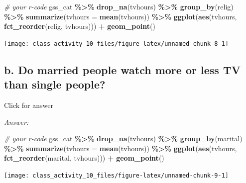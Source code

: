 \documentclass[
]{book}
\newenvironment{Shaded}{\begin{snugshade}}{\end{snugshade}}
\newcommand{\AttributeTok}[1]{\textcolor[rgb]{0.13,0.29,0.53}{#1}}
\newcommand{\CommentTok}[1]{\textcolor[rgb]{0.56,0.35,0.01}{\textit{#1}}}
\newcommand{\FunctionTok}[1]{\textcolor[rgb]{0.13,0.29,0.53}{\textbf{#1}}}
\newcommand{\NormalTok}[1]{#1}
\newcommand{\SpecialCharTok}[1]{\textcolor[rgb]{0.81,0.36,0.00}{\textbf{#1}}}
\begin{document}
\begin{Shaded}
\begin{Highlighting}[]
\CommentTok{\# your r{-}code}
\NormalTok{gss\_cat }\SpecialCharTok{\%\textgreater{}\%}
  \FunctionTok{drop\_na}\NormalTok{(tvhours) }\SpecialCharTok{\%\textgreater{}\%}
  \FunctionTok{group\_by}\NormalTok{(relig) }\SpecialCharTok{\%\textgreater{}\%}
  \FunctionTok{summarize}\NormalTok{(}\AttributeTok{tvhours =} \FunctionTok{mean}\NormalTok{(tvhours)) }\SpecialCharTok{\%\textgreater{}\%}
  \FunctionTok{ggplot}\NormalTok{(}\FunctionTok{aes}\NormalTok{(tvhours, }\FunctionTok{fct\_reorder}\NormalTok{(relig, tvhours))) }\SpecialCharTok{+}
    \FunctionTok{geom\_point}\NormalTok{()}
\end{Highlighting}
\end{Shaded}

\texttt{[image: class\_activity\_10\_files/figure-latex/unnamed-chunk-8-1]}

\hypertarget{b.-do-married-people-watch-more-or-less-tv-than-single-people}{%
\subsection{b. Do married people watch more or less TV than single people?}\label{b.-do-married-people-watch-more-or-less-tv-than-single-people}}

Click for answer

\emph{Answer:}

\begin{Shaded}
\begin{Highlighting}[]
\CommentTok{\# your r{-}code}
\NormalTok{gss\_cat }\SpecialCharTok{\%\textgreater{}\%}
  \FunctionTok{drop\_na}\NormalTok{(tvhours) }\SpecialCharTok{\%\textgreater{}\%}
  \FunctionTok{group\_by}\NormalTok{(marital) }\SpecialCharTok{\%\textgreater{}\%}
  \FunctionTok{summarize}\NormalTok{(}\AttributeTok{tvhours =} \FunctionTok{mean}\NormalTok{(tvhours)) }\SpecialCharTok{\%\textgreater{}\%}
  \FunctionTok{ggplot}\NormalTok{(}\FunctionTok{aes}\NormalTok{(tvhours, }\FunctionTok{fct\_reorder}\NormalTok{(marital, tvhours))) }\SpecialCharTok{+}
    \FunctionTok{geom\_point}\NormalTok{()}
\end{Highlighting}
\end{Shaded}

\texttt{[image: class\_activity\_10\_files/figure-latex/unnamed-chunk-9-1]}
\end{document}
